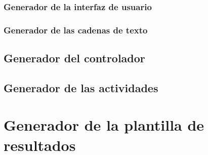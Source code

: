 \subsubsection{Generador de la interfaz de usuario}
\subsubsection{Generador de las cadenas de texto}

\subsection{Generador del controlador}
\subsection{Generador de las actividades}

\section{Generador de la plantilla de resultados}
